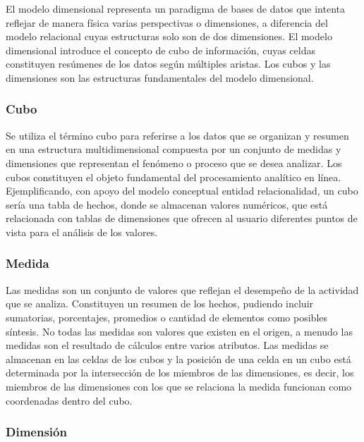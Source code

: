 El modelo dimensional representa un paradigma de bases de datos que intenta reflejar de manera física varias perspectivas o dimensiones, 
a diferencia del modelo relacional cuyas estructuras solo son de dos dimensiones. El modelo dimensional introduce el concepto 
de cubo de información, cuyas celdas constituyen resúmenes de los datos según m\'ultiples aristas. Los cubos y las dimensiones 
son las estructuras fundamentales del modelo dimensional.


\subsubsection{Cubo}

Se utiliza el término cubo para referirse a los datos que se organizan y resumen en una estructura multidimensional compuesta 
por un conjunto de medidas y dimensiones que representan el fenómeno o proceso que se desea analizar. Los cubos constituyen 
el objeto fundamental del procesamiento analítico en línea\cite{lismaster}. Ejemplificando, con apoyo del modelo conceptual
entidad relacionalidad, un cubo sería una tabla de hechos, donde se almacenan valores numéricos, que est\'a 
relacionada con tablas de dimensiones que ofrecen al usuario diferentes puntos de vista para el análisis de los valores.

\subsubsection{Medida}

Las medidas son un conjunto de valores que reflejan el desempeño de la actividad que se analiza. Constituyen un resumen de los 
hechos\cite{lismaster}, pudiendo incluir sumatorias, porcentajes, promedios o cantidad de elementos como posibles síntesis. 
No todas las medidas son valores que existen en el origen, a menudo las medidas son el resultado de cálculos entre 
varios atributos. Las medidas se almacenan en las celdas de los cubos y la posici\'on de una celda en un cubo est\'a determinada por la 
intersecci\'on de los miembros de las dimensiones, es decir, los miembros de las dimensiones con los que se relaciona la medida 
funcionan como coordenadas dentro del cubo.

\subsubsection{Dimensión}


